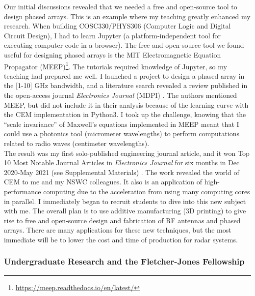\documentclass[../../../main.tex]{subfiles}
\begin{document}
Our initial discussions revealed that we needed a free and open-source tool to design phased arrays.  This is an example where my teaching greatly enhanced my research.  When building COSC330/PHYS306 (Computer Logic and Digital Circuit Design), I had to learn Jupyter (a platform-independent tool for executing computer code in a browser).  The free and open-source tool we found useful for designing phased arrays is the MIT Electromagnetic Equation Propagator (MEEP)\footnote{\url{https://meep.readthedocs.io/en/latest/}}.  The tutorials required knowledge of Jupyter, so my teaching had prepared me well.  I launched a project to design a phased array in the [1-10] GHz bandwidth, and a literature search revealed a review published in the open-access journal \textit{Electronics Journal} (MDPI) \cite{10.3390/electronics8121506}.  The authors mentioned MEEP, but did not include it in their analysis because of the learning curve with the CEM implementation in Python3.  I took up the challenge, knowing that the ``scale invariance'' of Maxwell's equations implemented in MEEP meant that I could use a photonics tool (micrometer wavelengths) to perform computations related to radio waves (centimeter wavelengths).
\\
\vspace{0.25cm}
The result was my first solo-published engineering journal article, and it won Top 10 Most Notable Journal Articles in \textit{Electronics Journal} for six months in Dec 2020-May 2021 (see Supplemental Materials) \cite{electronics10040415}.  The work revealed the world of CEM to me and my NSWC colleagues.  It also is an application of high-performance computing due to the acceleration from using many computing cores in parallel.  I immediately began to recruit students to dive into this new subject with me.  The overall plan is to use additive manufacturing (3D printing) to give rise to free and open-source design and fabrication of RF antennas and phased arrays.  There are many applications for these new techniques, but the most immediate will be to lower the cost and time of production for radar systems.

\subsubsection{Undergraduate Research and the Fletcher-Jones Fellowship}
\end{document}
